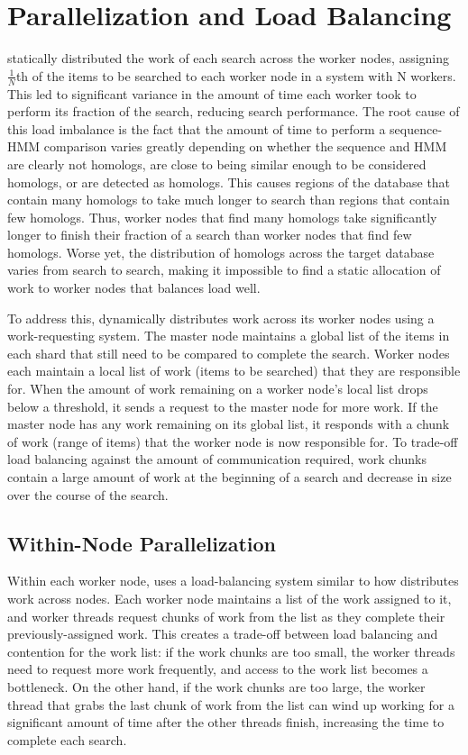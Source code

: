 \documentclass[notoc,justified,openany]{tufte-book}    %
\newcommand{\hmmserver}{\mono{hmmserver}\xspace}
\newcommand{\hmmpgmd}{\mono{hmmpgmd}\xspace}
\newcommand{\Hmmpgmd}{\mono{Hmmpgmd}\xspace}
\begin{document}
\section{Parallelization and Load Balancing}
\Hmmpgmd statically distributed the work of each search across the worker nodes, assigning $\frac{1}{N}$th of the items to be searched to each worker node in a system with N workers.  This led to significant variance in the amount of time each worker took to perform its fraction of the search, reducing search performance. The root cause of this load imbalance is the fact that the amount of time to perform a sequence-HMM comparison varies greatly depending on whether the sequence and HMM are clearly not homologs, are close to being similar enough to be considered homologs, or are detected as homologs.  This causes regions of the database that contain many homologs to take much longer to search than regions that contain few homologs.  Thus, worker nodes that find many homologs take significantly longer to finish their fraction of a search than worker nodes that find few homologs.  Worse yet, the distribution of homologs across the target database varies from search to search, making it impossible to find a static allocation of work to worker nodes that balances load well.

To address this, \hmmserver dynamically distributes work across its worker nodes using a work-requesting system.  The master node maintains a global list of the items in each shard that still need to be compared to complete the search.  Worker nodes each maintain a local list of work (items to be searched) that they are responsible for.  When the amount of work remaining on a worker node's local list drops below a threshold, it sends a request to the master node for more work.  If the master node has any work remaining on its global list, it responds with a chunk of work (range of items) that the worker node is now responsible for.  To trade-off load balancing against the amount of communication required, work chunks contain a large amount of work at the beginning of a search and decrease in size over the course of the search.

\subsection{Within-Node Parallelization}
Within each worker node, \hmmpgmd uses a load-balancing system similar to how \hmmserver distributes work across nodes.  Each worker node maintains a list of the work assigned to it, and worker threads request chunks of work from the list as they complete their previously-assigned work.  This creates a trade-off between load balancing and contention for the work list: if the work chunks are too small, the worker threads need to request more work frequently, and access to the work list becomes a bottleneck.  On the other hand, if the work chunks are too large, the worker thread that grabs the last chunk of work from the list can wind up working for a significant amount of time after the other threads finish, increasing the time to complete each search.
\end{document}
